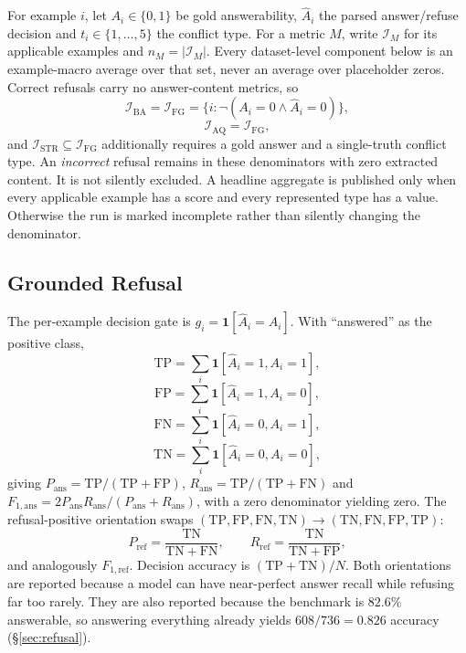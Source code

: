 For example $i$, let $A_i\in\{0,1\}$ be gold answerability, $\hat A_i$ the parsed
answer/refuse decision and $t_i\in\{1,\dots,5\}$ the conflict type. For a metric
$M$, write $\mathcal{I}_M$ for its applicable examples and $n_M=|\mathcal{I}_M|$.
Every dataset-level component below is an example-macro average over that set,
never an average over placeholder zeros. Correct refusals carry no
answer-content metrics, so
\[
\mathcal{I}_{\mathrm{BA}}=\mathcal{I}_{\mathrm{FG}}
=\{i:\neg(A_i=0 \wedge \hat A_i=0)\},
\]
\[
\mathcal{I}_{\mathrm{AQ}}=\mathcal{I}_{\mathrm{FG}},
\]
and $\mathcal{I}_{\mathrm{STR}}\subseteq\mathcal{I}_{\mathrm{FG}}$ additionally
requires a gold answer and a single-truth conflict type. An \emph{incorrect}
refusal remains in these denominators with zero extracted content. It is not
silently excluded. A headline aggregate is published only when every applicable
example has a score and every represented type has a value. Otherwise the run is
marked incomplete rather than silently changing the denominator.

\subsection{Grounded Refusal}

The per-example decision gate is $g_i=\mathbf{1}[\hat A_i=A_i]$. With
``answered'' as the positive class,
\[
\mathrm{TP}=\textstyle\sum_i\mathbf{1}[\hat A_i{=}1,A_i{=}1],
\]
\[
\mathrm{FP}=\textstyle\sum_i\mathbf{1}[\hat A_i{=}1,A_i{=}0],
\]
\[
\mathrm{FN}=\textstyle\sum_i\mathbf{1}[\hat A_i{=}0,A_i{=}1],
\]
\[
\mathrm{TN}=\textstyle\sum_i\mathbf{1}[\hat A_i{=}0,A_i{=}0],
\]
giving $P_{\mathrm{ans}}=\mathrm{TP}/(\mathrm{TP}+\mathrm{FP})$,
$R_{\mathrm{ans}}=\mathrm{TP}/(\mathrm{TP}+\mathrm{FN})$ and
$F_{1,\mathrm{ans}}=2P_{\mathrm{ans}}R_{\mathrm{ans}}/(P_{\mathrm{ans}}+R_{\mathrm{ans}})$,
with a zero denominator yielding zero. The refusal-positive orientation swaps
$(\mathrm{TP},\mathrm{FP},\mathrm{FN},\mathrm{TN})\!\to\!(\mathrm{TN},\mathrm{FN},\mathrm{FP},\mathrm{TP})$:
\[
P_{\mathrm{ref}}=\frac{\mathrm{TN}}{\mathrm{TN}+\mathrm{FN}},\qquad
R_{\mathrm{ref}}=\frac{\mathrm{TN}}{\mathrm{TN}+\mathrm{FP}},
\]
and analogously $F_{1,\mathrm{ref}}$. Decision accuracy is
$(\mathrm{TP}+\mathrm{TN})/N$. Both orientations are reported because a model can
have near-perfect answer recall while refusing far too rarely. They are also reported because the
benchmark is $82.6\%$ answerable, so answering everything already yields
$608/736=0.826$ accuracy (\S\ref{sec:refusal}).

